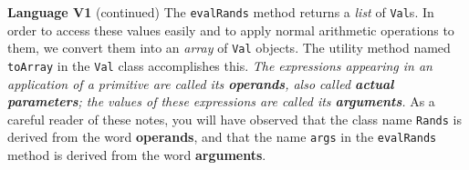 \begin{minipage}[t]{\sw}
\slidenumber
\LARGE
{\bf Language V1} (continued)\exx
The \verb'evalRands' method returns a {\em list} of \verb'Val's.
In order to access these values easily and
to apply normal arithmetic operations to them,
we convert them into an {\em array} of \verb'Val' objects.
The utility method named \verb'toArray' in the \verb'Val' class
accomplishes this.\exx
{\em The expressions appearing in an application of a primitive
are called its {\bf operands},
also called {\bf actual parameters};
the values of these expressions are called its {\bf arguments}.}\exx
As a careful reader of these notes,
you will have observed that the class name \verb'Rands'
is derived from the word {\bf operands},
and that the name \verb'args' in the \verb'evalRands' method
is derived from the word {\bf arguments}.
\end{minipage}
